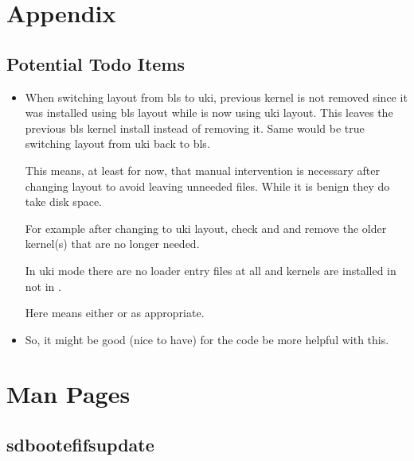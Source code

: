 \documentclass[letterpaper,11pt,english]{sphinxmanual}
\begin{document}
\sphinxstepscope


\chapter{Appendix}
\label{\detokenize{Appendix:appendix}}\label{\detokenize{Appendix::doc}}

\section{Potential Todo Items}
\label{\detokenize{Appendix:potential-todo-items}}\begin{itemize}
\item {} 
\sphinxAtStartPar
When switching layout from bls to uki, previous kernel is not removed
since it was installed using bls layout while 
is now using uki layout. This leaves the previous bls kernel install instead of
removing it. Same would be true switching layout from uki back to bls.

\sphinxAtStartPar
This means, at least for now, that manual intervention is necessary after changing layout
to avoid leaving un\sphinxhyphen{}needed files. While it is benign they do take disk space.

\sphinxAtStartPar
For example after changing to uki layout, check  and
 and remove the older kernel(s) that are no longer needed.

\sphinxAtStartPar
In uki mode there are no loader entry files at all and kernels are installed
in  not in .

\sphinxAtStartPar
Here  means either  or  as appropriate.

\item {} 
\sphinxAtStartPar
So, it might be good (nice to have) for the code be more helpful with this.

\end{itemize}


\chapter{Man Pages}
\label{\detokenize{index:man-pages}}
\sphinxstepscope


\section{sd\sphinxhyphen{}boot\sphinxhyphen{}efifs\sphinxhyphen{}update}
\label{\detokenize{_build/man-ready/sd-boot-efifs-update.8:sd-boot-efifs-update}}\label{\detokenize{_build/man-ready/sd-boot-efifs-update.8::doc}}
\end{document}
